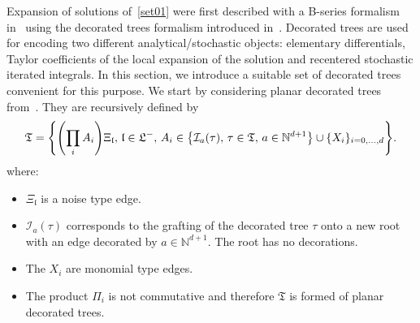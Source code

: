 \documentclass[AHL,Unicode,longabstracts]{cedram}
\newcommand*\I{\mathcal{I}}
\newcommand*\CI{\I}
\newcommand{\mfl}{\mathfrak{l}}
\newcommand{\mfL}{\mathfrak{L}}
\newcommand*\fkT{\mathfrak{T}}
\newcommand{\bbN}{\mathbb{N}}
\let\originalleft\left
\let\originalright\right
\renewcommand{\left}{\mathopen{}\mathclose\bgroup\originalleft}
\renewcommand{\right}{\aftergroup\egroup\originalright}
\begin{document}
Expansion of solutions of~\eqref{set01} were first described with a B-series formalism in~\cite{BCCH} using the decorated trees formalism introduced in~\cite{BHZ,reg}. Decorated trees are used for encoding two different analytical/stochastic objects: elementary differentials, Taylor coefficients of the local expansion of the solution and recentered stochastic iterated integrals. In this section, we introduce a suitable set of decorated trees convenient for this purpose. We start by considering planar decorated trees from~\cite[Section~4]{BK23}. They are recursively defined by
\begin{equation*}
\fkT = \left\{ \left(\prod_{i} A_i\right) \Xi_{\mfl}, \, \mfl \in \mfL^-, \, A_i \in \left\{ \CI_a(\tau), \, \tau \in \fkT, \, a\in \bbN^{d+1} \right\} \cup \{ X_{i} \}_{i = 0,\dots, d} \right\}.
\end{equation*}
where:
\begin{itemize}
\item $ \Xi_{\mfl} $ is a noise type edge.
\item $ \CI_a(\tau) $ corresponds to the grafting of the decorated tree $ \tau $ onto a new root with an edge decorated by $ a \in \bbN^{d+1} $. The root has no decorations.
\item The $ X_i $ are monomial type edges.
\item The product $ \Pi_i $ is not commutative and therefore $ \fkT $ is formed of planar decorated trees.
\end{itemize}
\end{document}
